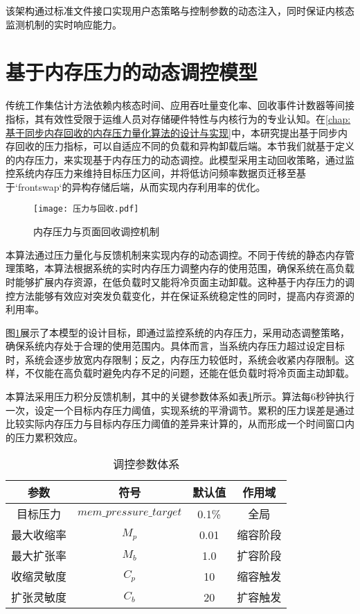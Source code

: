 该架构通过标准文件接口实现用户态策略与控制参数的动态注入，同时保证内核态监测机制的实时响应能力。




\section{基于内存压力的动态调控模型}
\label{sec:pressure_based_model}

传统工作集估计方法依赖内核态时间、应用吞吐量变化率、回收事件计数器等间接指标，其有效性受限于运维人员对存储硬件特性与内核行为的专业认知。在\ref{chap:基于同步内存回收的内存压力量化算法的设计与实现}中，本研究提出基于同步内存回收的压力指标，可以自适应不同的负载和异构卸载后端。本节我们就基于定义的内存压力，来实现基于内存压力的动态调控。此模型采用主动回收策略，通过监控系统内存压力来维持目标压力区间，并将低访问频率数据页迁移至基于`frontswap`的异构存储后端，从而实现内存利用率的优化。

\begin{figure}[h]
\centering
\texttt{[image: 压力与回收.pdf]}
\caption{内存压力与页面回收调控机制}
\label{fig:pressure_work_set}
\end{figure}

本算法通过压力量化与反馈机制来实现内存的动态调控。不同于传统的静态内存管理策略，本算法根据系统的实时内存压力调整内存的使用范围，确保系统在高负载时能够扩展内存资源，在低负载时又能将冷页面主动卸载。这种基于内存压力的调控方法能够有效应对突发负载变化，并在保证系统稳定性的同时，提高内存资源的利用率。

图\ref{fig:pressure_work_set}展示了本模型的设计目标，即通过监控系统的内存压力，采用动态调整策略，确保系统内存处于合理的使用范围内。具体而言，当系统内存压力超过设定目标时，系统会逐步放宽内存限制；反之，内存压力较低时，系统会收紧内存限制。这样，不仅能在高负载时避免内存不足的问题，还能在低负载时将冷页面主动卸载。

本算法采用压力积分反馈机制，其中的关键参数体系如表\ref{tab:params}所示。算法每6秒钟执行一次，设定一个目标内存压力阈值，实现系统的平滑调节。累积的压力误差是通过比较实际内存压力与目标内存压力阈值的差异来计算的，从而形成一个时间窗口内的压力累积效应。



\begin{table}[H]
\centering
\caption{调控参数体系}
\label{tab:params}
\begin{tabular}{cccc}
\toprule
参数 & 符号 & 默认值 & 作用域 \\
\midrule
目标压力 & \(mem\_pressure\_target\) & 0.1\% & 全局 \\
最大收缩率 & \(M_p\) & 0.01 & 缩容阶段 \\
最大扩张率 & \(M_b\) & 1.0 & 扩容阶段 \\
收缩灵敏度 & \(C_p\) & 10 & 缩容触发 \\
扩张灵敏度 & \(C_b\) & 20 & 扩容触发 \\
\bottomrule
\end{tabular}
\end{table}

